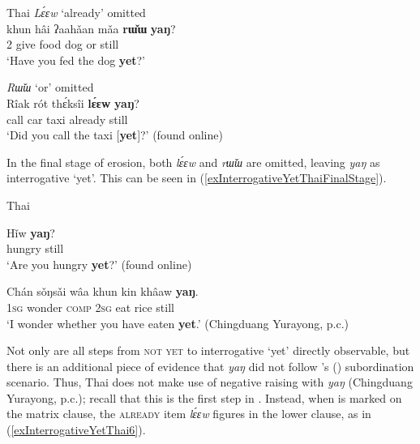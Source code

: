  \begin{exe}
	\ex{}
	\label{exInterrogativeYetThai}
	\begin{xlist}
		\exi{}Thai
		\ex\textit{Lɛ́ɛw} \lq already' omitted\label{exInterrogativeYetThai2} \\
		\gll khun	hâi	ʔaahǎan	mǎa	\textbf{rɯ̌ɯ}	\textbf{yaŋ}?\\
		2 give food dog or still\\
		\glt \lq Have you fed the dog \textbf{yet}?' \parencite[80]{Smyth2002}

		\ex
		\textit{Rɯ̌ɯ} \lq or' omitted	\label{exInterrogativeYetThai3}\\
		\gll Rîak	rót	thɛ́ksîi	\textbf{lɛ́ɛw}		\textbf{yaŋ}?\\
	call car taxi already still\\
	\glt \lq Did you call the taxi [\textbf{yet}]?' (found online)%
	\end{xlist}
\end{exe}

 In the final stage of erosion, both \textit{lɛ́ɛw} and \textit{rɯ̌ɯ} are omitted, leaving \textit{yaŋ} as interrogative \lq yet\rq. This can be seen in (\ref{exInterrogativeYetThaiFinalStage}).
	
\begin{exe}
	\ex \label{exInterrogativeYetThaiFinalStage}
	\begin{xlist}
		\exi{}Thai

		\ex
		\gll Hǐw		\textbf{yaŋ}?\\
	 hungry still\\
	 \glt \lq Are you hungry \textbf{yet}?\rq{ }(found online)%

	\ex
	\gll Chán	sǒŋsǎi	wâa		khun	kin	khâaw	\textbf{yaŋ}.\\
	1\textsc{sg} wonder \textsc{comp} 2\textsc{sg} eat rice still\\
	\glt \lq I wonder whether you have eaten \textbf{yet}.\rq{ }(Chingduang Yurayong, p.c.)
	\end{xlist}
\end{exe}

Not only are all steps from \textsc{not yet} to interrogative \lq yet\rq{ }directly observable, but there is an additional piece of evidence that \textit{yaŋ} did not follow \citeauthor{vanderAuwera1998}'s (\citeyear{vanderAuwera1998}) subordination scenario. Thus, Thai does not make use of negative raising with \textit{yaŋ} (Chingduang Yurayong, p.c.); recall that this is the first step in . Instead, when  is marked on the matrix clause, the \textsc{already} item \textit{lɛ́ɛw} figures in the lower clause, as in (\ref{exInterrogativeYetThai6}). 


